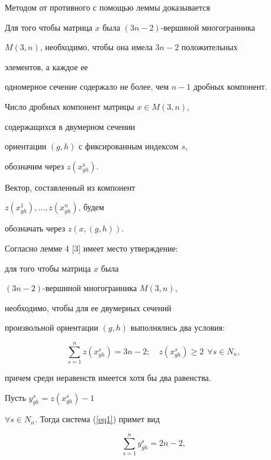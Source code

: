 Методом от противного с помощью леммы доказывается





\begin{thm}


Для того чтобы матрица $x$ была $(3n-2)$-вершиной многогранника


$M(3,n)$, необходимо, чтобы она имела $3n-2$ положительных 


элементов, а каждое ее


одномерное сечение содержало не более, чем $n-1$ дробных компонент.


\end{thm}





Число дробных компонент матрицы $x\in M(3,n)$, 


содержащихся в двумерном сечении


ориентации $(g,h)$ с фиксированным индексом $s$, 


обозначим через $z(x^s_{gh})$.


Вектор, составленный из компонент


$z(x^1_{gh}),\dotsc,z(x^n_{gh})$, будем


обозначать через $z(x,(g,h))$.





Согласно лемме 4 [3] имеет место утверждение: 


для того чтобы матрица $x$ была


$(3n-2)$-вершиной многогранника $M(3,n)$, 


необходимо, чтобы для ее двумерных сечений


произвольной ориентации $(g,h)$ выполнялись два условия:


\begin{equation} \label{eq1}


\sum\limits_{s=1}^n z(x^s_{gh})=3n-2;


\quad z(x^s_{gh})\geq 2\ \ \forall s\in N_n,


\end{equation}


причем среди неравенств имеется хотя бы два равенства. 


Пусть $y^s_{gh}=z(x^s_{gh})-1$


$\forall s\in N_n$. Тогда система (\ref{eq1}) примет вид


\begin{equation} \label{eq2}


\sum\limits_{s=1}^n y^s_{gh}=2n-2,


\end{equation}


